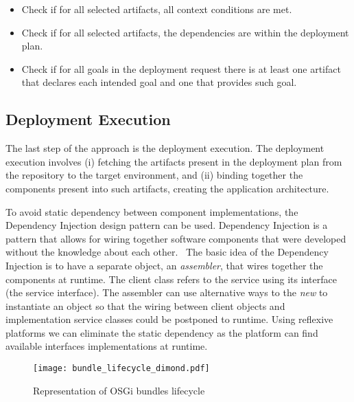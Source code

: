 \begin{itemize}
  \item Check if for all selected artifacts, all context conditions are met.
  \item Check if for all selected artifacts, the dependencies are within the deployment plan.
  \item Check if for all goals in the deployment request there is at least one artifact that declares each intended goal and one that provides such goal.
\end{itemize}

\subsection{Deployment Execution}

The last step of the approach is the deployment execution. The deployment execution involves (i) fetching the artifacts present in the deployment plan from the repository to the target environment, and (ii) binding together the components present into such artifacts, creating the application architecture.

To avoid static dependency between component implementations, the Dependency Injection\cite{fowler_inversion_2004} design pattern can be used.
Dependency Injection is a pattern that allows for wiring together software components that were developed without the knowledge about each other.~\cite{fowler_inversion_2004}
The basic idea of the Dependency Injection is to have a separate object, an \emph{assembler}, that wires together the components at runtime\cite{fowler_inversion_2004}. The client class refers to the service using its interface (the service interface). The assembler can use alternative ways to the \emph{new} to instantiate an object so that the wiring between client objects and implementation service classes could be postponed to runtime. Using reflexive platforms we can eliminate the static dependency as the platform can find available interfaces implementations at runtime.

\begin{figure}[!htb]
  \centering
  \texttt{[image: bundle\_lifecycle\_dimond.pdf]}
  \caption{Representation of OSGi bundles lifecycle}
  \label{fig:osgi_bundles}
\end{figure}

